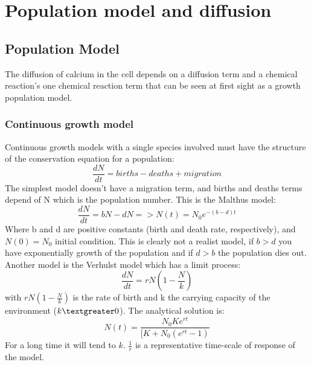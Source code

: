 \documentclass[a4paper,11pt]{report}
\begin{document}
\chapter{Population model and diffusion}
\section{ Population Model}
The diffusion of calcium in the cell depends on a diffusion term and a chemical reaction's one chemical reaction term that can be seen at first sight as a growth population model.  
\subsection{Continuous growth model}
Continuous growth models with a single species involved must have the structure of the conservation equation for a population:
$$ \frac{dN}{dt}=births-deaths+migration $$
The simplest model doesn't have a migration term, and births and deaths terms depend of N which is the population number. This is the Malthus model:
$$ \frac{dN}{dt}=bN-dN  => N(t)=N_{0}e^{-(b-d)t}$$
Where b and d are positive constants (birth and death rate, respectively), and $N(0)=N_{0}$ initial condition. 
This is clearly not a realist model, if $b>d$ you have exponentially growth of the population and if $d>b$ the population dies out.\\
Another model is the Verhulst model which has a limit process: \\
$$ \frac{dN}{dt}=rN(1-\frac{N}{k}) $$
with $rN(1-\frac{N}{k})$ is the rate of birth and k the carrying capacity of the environment ($k \textgreater 0$). The analytical solution is: \\
$$ N(t)=\frac{N_{0}Ke^{rt}}{[K+N_{0}(e^{rt}-1)}$$
For a long time it will tend to $k$. $\frac{1}{r}$ is a representative time-scale of response of the model.
\end{document}
